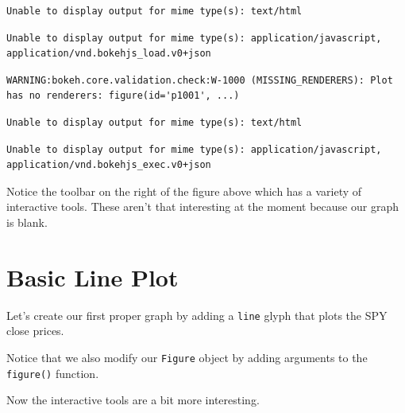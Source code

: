 \documentclass[
  letterpaper,
  DIV=11,
  numbers=noendperiod]{scrreprt}
\begin{document}
\begin{verbatim}
Unable to display output for mime type(s): text/html
\end{verbatim}

\begin{verbatim}
Unable to display output for mime type(s): application/javascript, application/vnd.bokehjs_load.v0+json
\end{verbatim}

\begin{verbatim}
WARNING:bokeh.core.validation.check:W-1000 (MISSING_RENDERERS): Plot has no renderers: figure(id='p1001', ...)
\end{verbatim}

\begin{verbatim}
Unable to display output for mime type(s): text/html
\end{verbatim}

\begin{verbatim}
Unable to display output for mime type(s): application/javascript, application/vnd.bokehjs_exec.v0+json
\end{verbatim}

Notice the toolbar on the right of the figure above which has a variety
of interactive tools. These aren't that interesting at the moment
because our graph is blank.

\hypertarget{basic-line-plot}{%
\section{Basic Line Plot}\label{basic-line-plot}}

Let's create our first proper graph by adding a \texttt{line} glyph that
plots the SPY close prices.

Notice that we also modify our \texttt{Figure} object by adding
arguments to the \texttt{figure()} function.

Now the interactive tools are a bit more interesting.
\end{document}
